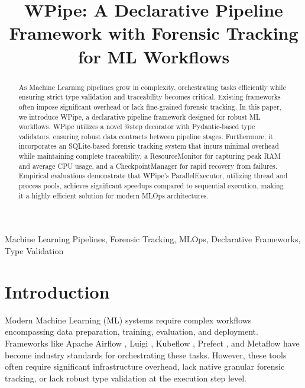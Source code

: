 \documentclass[conference]{IEEEtran}
\begin{document}
\title{WPipe: A Declarative Pipeline Framework with Forensic Tracking for ML Workflows}

\author{
}

\maketitle

\begin{abstract}
As Machine Learning pipelines grow in complexity, orchestrating tasks efficiently while ensuring strict type validation and traceability becomes critical. Existing frameworks often impose significant overhead or lack fine-grained forensic tracking. In this paper, we introduce WPipe, a declarative pipeline framework designed for robust ML workflows. WPipe utilizes a novel @step decorator with Pydantic-based type validators, ensuring robust data contracts between pipeline stages. Furthermore, it incorporates an SQLite-based forensic tracking system that incurs minimal overhead while maintaining complete traceability, a ResourceMonitor for capturing peak RAM and average CPU usage, and a CheckpointManager for rapid recovery from failures. Empirical evaluations demonstrate that WPipe's ParallelExecutor, utilizing thread and process pools, achieves significant speedups compared to sequential execution, making it a highly efficient solution for modern MLOps architectures.
\end{abstract}

\begin{IEEEkeywords}
Machine Learning Pipelines, Forensic Tracking, MLOps, Declarative Frameworks, Type Validation
\end{IEEEkeywords}

\section{Introduction}
Modern Machine Learning (ML) systems require complex workflows encompassing data preparation, training, evaluation, and deployment. Frameworks like Apache Airflow \cite{airflow}, Luigi \cite{luigi}, Kubeflow \cite{kubeflow}, Prefect \cite{prefect}, and Metaflow \cite{metaflow} have become industry standards for orchestrating these tasks. However, these tools often require significant infrastructure overhead, lack native granular forensic tracking, or lack robust type validation at the execution step level.
\end{document}
